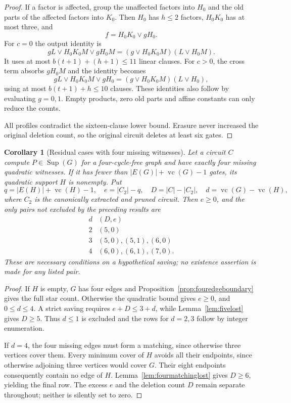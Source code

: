 \documentclass[11pt]{article}
\newcommand{\Sup}{\operatorname{Sup}}
\newcommand{\vc}{\operatorname{vc}}
\newtheorem{corollary}[theorem]{Corollary}
\theoremstyle{definition}
\theoremstyle{remark}
\begin{document}
\begin{proof}
If a factor is affected, group the unaffected factors into $H_0$ and the old parts of the affected factors into $K_0$. Then $H_0$ has $h\le2$ factors, $H_0K_0$ has at most three, and
\[
 f=H_0K_0\vee gH_0.
\]
For $c=0$ the output identity is
\[
 gL\vee H_0K_0M\vee gH_0M
   =(g\vee H_0K_0M)(L\vee H_0M).
\]
It uses at most $b(t+1)+(h+1)\le11$ linear clauses. For $c>0$, the cross term absorbs $gH_0M$ and the identity becomes
\[
 gL\vee H_0K_0M\vee gH_0
   =(g\vee H_0K_0M)(L\vee H_0),
\]
using at most $b(t+1)+h\le10$ clauses. These identities also follow by evaluating $g=0,1$. Empty products, zero old parts and affine constants can only reduce the counts.

All profiles contradict the sixteen-clause lower bound. Erasure never increased the original deletion count, so the original circuit deletes at least six gates.
\end{proof}

\begin{corollary}[Residual cases with four missing witnesses]\label{cor:fourmissingledger}
Let a circuit $C$ compute $P\in\Sup(G)$ for a four-cycle-free graph and have exactly four missing quadratic witnesses. If it has fewer than $|E(G)|+\vc(G)-1$ gates, its quadratic support $H$ is nonempty. Put
\[
 q=|E(H)|+\vc(H)-1,\quad
 e=|C_2|-q,\quad D=|C|-|C_2|,\quad
 d=\vc(G)-\vc(H),
\]
where $C_2$ is the canonically extracted and pruned circuit. Then $e\ge0$, and the only pairs not excluded by the preceding results are
\[
\begin{array}{c|l}
 d & (D,e)\\ \hline
 2 &(5,0)\\
 3 &(5,0),(5,1),(6,0)\\
 4 &(6,0),(6,1),(7,0).
\end{array}
\]
These are necessary conditions on a hypothetical saving; no existence assertion is made for any listed pair.
\end{corollary}
\begin{proof}
If $H$ is empty, $G$ has four edges and Proposition~\ref{prop:fouredgeboundary} gives the full star count. Otherwise the quadratic bound gives $e\ge0$, and $0\le d\le4$. A strict saving requires $e+D\le3+d$, while Lemma~\ref{lem:fivelost} gives $D\ge5$. Thus $d\le1$ is excluded and the rows for $d=2,3$ follow by integer enumeration.

If $d=4$, the four missing edges must form a matching, since otherwise three vertices cover them. Every minimum cover of $H$ avoids all their endpoints, since otherwise adjoining three vertices would cover $G$. Their eight endpoints consequently contain no edge of $H$. Lemma~\ref{lem:fourmatchinglost} gives $D\ge6$, yielding the final row. The excess $e$ and the deletion count $D$ remain separate throughout; neither is silently set to zero.
\end{proof}
\end{document}
